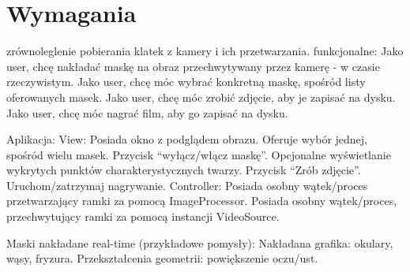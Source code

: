 \section{Wymagania}



zrównoleglenie pobierania klatek z kamery i ich przetwarzania.
funkcjonalne:
Jako user, chcę nakładać maskę na obraz przechwytywany przez kamerę - w czasie rzeczywistym.
Jako user, chcę móc wybrać konkretną maskę, spośród listy oferowanych masek.
Jako user, chcę móc zrobić zdjęcie, aby je zapisać na dysku.
Jako user, chcę móc nagrać film, aby go zapisać na dysku.


Aplikacja:
View:
Posiada okno z podglądem obrazu.
Oferuje wybór jednej, spośród wielu masek.
Przycisk “wyłącz/włącz maskę”.
Opcjonalne wyświetlanie wykrytych punktów charakterystycznych twarzy.
Przycisk “Zrób zdjęcie”.
Uruchom/zatrzymaj nagrywanie.
Controller:
Posiada osobny wątek/proces przetwarzający ramki za pomocą ImageProcessor.
Posiada osobny wątek/proces, przechwytujący ramki za pomocą instancji VideoSource.


Maski nakładane real-time (przykładowe pomysły):
Nakładana grafika:
okulary,
wąsy,
fryzura.
Przekształcenia geometrii:	
powiększenie oczu/ust.
